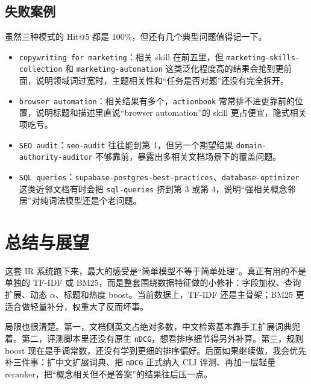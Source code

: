 \subsection{失败案例}
虽然三种模式的 Hit@5 都是 100\%，但还有几个典型问题值得记一下。
\begin{itemize}
  \item \texttt{copywriting for marketing}：相关 skill 在前五里，但 \texttt{marketing-skills-collection} 和 \texttt{marketing-automation} 这类泛化程度高的结果会抢到更前面，说明领域词过宽时，主题相关性和“任务是否对题”还没有完全拆开。
  \item \texttt{browser automation}：相关结果有多个，\texttt{actionbook} 常常排不进更靠前的位置，说明标题和描述里直说“browser automation”的 skill 更占便宜，隐式相关项吃亏。
  \item \texttt{SEO audit}：\texttt{seo-audit} 往往能到第 1，但另一个期望结果 \texttt{domain-authority-auditor} 不够靠前，暴露出多相关文档场景下的覆盖问题。
  \item \texttt{SQL queries}：\texttt{supabase-postgres-best-practices}、\texttt{database-optimizer} 这类近邻文档有时会把 \texttt{sql-queries} 挤到第 3 或第 4，说明“强相关概念邻居”对纯词法模型还是个老问题。
\end{itemize}

\section{总结与展望}
这套 IR 系统跑下来，最大的感受是“简单模型不等于简单处理”。真正有用的不是单独的 TF-IDF 或 BM25，而是整套围绕数据特征做的小修补：字段加权、查询扩展、动态 $\alpha$、标题和热度 boost。当前数据上，TF-IDF 还是主骨架；BM25 更适合做轻量补分，权重大了反而坏事。

局限也很清楚。第一，文档侧英文占绝对多数，中文检索基本靠手工扩展词典兜着。第二，评测脚本里还没有原生 \texttt{nDCG}，想看排序细节得另外补算。第三，规则 boost 现在是手调常数，还没有学到更细的排序偏好。后面如果继续做，我会优先补三件事：扩中文扩展词典、把 \texttt{nDCG} 正式纳入 CLI 评测、再加一层轻量 reranker，把“概念相关但不是答案”的结果往后压一点。



